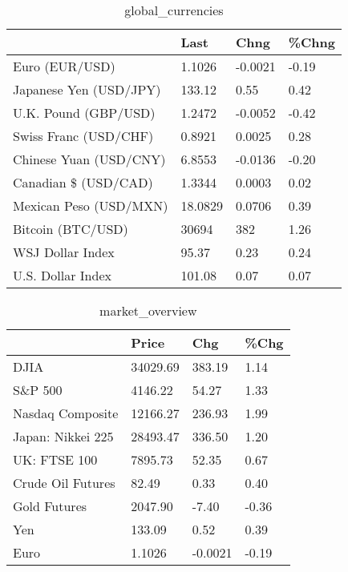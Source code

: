 \documentclass{article}%
\begin{document}
%


\begin{table}[htbp]%
\caption{global\_currencies}%
\centering%
\begin{adjustbox}{width=1\textwidth}%
\begin{tabular}{llll}
\toprule
                       &    Last &    Chng & \%Chng \\
\midrule
        Euro (EUR/USD) &  1.1026 & -0.0021 & -0.19 \\
Japanese Yen (USD/JPY) &  133.12 &    0.55 &  0.42 \\
  U.K. Pound (GBP/USD) &  1.2472 & -0.0052 & -0.42 \\
 Swiss Franc (USD/CHF) &  0.8921 &  0.0025 &  0.28 \\
Chinese Yuan (USD/CNY) &  6.8553 & -0.0136 & -0.20 \\
  Canadian \$ (USD/CAD) &  1.3344 &  0.0003 &  0.02 \\
Mexican Peso (USD/MXN) & 18.0829 &  0.0706 &  0.39 \\
     Bitcoin (BTC/USD) &   30694 &     382 &  1.26 \\
      WSJ Dollar Index &   95.37 &    0.23 &  0.24 \\
     U.S. Dollar Index &  101.08 &    0.07 &  0.07 \\
\bottomrule
\end{tabular}
%
\end{adjustbox}%
\end{table}

%


\begin{table}[htbp]%
\caption{market\_overview}%
\centering%
\begin{adjustbox}{width=1\textwidth}%
\begin{tabular}{llll}
\toprule
                  &    Price &     Chg &  \%Chg \\
\midrule
             DJIA & 34029.69 &  383.19 &  1.14 \\
          S\&P 500 &  4146.22 &   54.27 &  1.33 \\
 Nasdaq Composite & 12166.27 &  236.93 &  1.99 \\
Japan: Nikkei 225 & 28493.47 &  336.50 &  1.20 \\
     UK: FTSE 100 &  7895.73 &   52.35 &  0.67 \\
Crude Oil Futures &    82.49 &    0.33 &  0.40 \\
     Gold Futures &  2047.90 &   -7.40 & -0.36 \\
              Yen &   133.09 &    0.52 &  0.39 \\
             Euro &   1.1026 & -0.0021 & -0.19 \\
\bottomrule
\end{tabular}
%
\end{adjustbox}%
\end{table}

%
\end{document}
